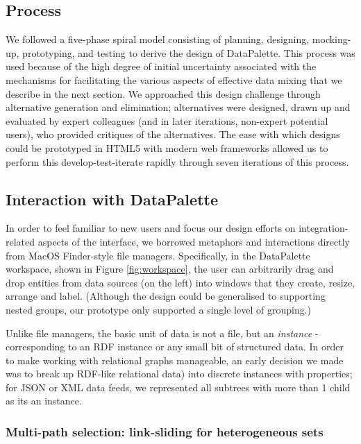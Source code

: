 \documentclass{sigchi}
\begin{document}
\subsection{Process}
We followed a five-phase spiral model consisting of planning, designing, mocking-up, prototyping, and testing to derive the design of DataPalette.  This process was used because of the high degree of initial uncertainty associated with the mechanisms for facilitating the various aspects of effective data mixing that we describe in the next section. We approached this design challenge through alternative generation and elimination; alternatives were designed, drawn up and evaluated by expert colleagues (and in later iterations, non-expert potential users), who provided critiques of the alternatives. The ease with which designs could be prototyped in HTML5 with modern web frameworks allowed us to perform this develop-test-iterate rapidly through seven iterations of this process.

\subsection{Interaction with DataPalette}
In order to feel familiar to new users and focus our design efforts on integration-related aspects of the interface, we borrowed metaphors and interactions directly from MacOS Finder-style file managers.  Specifically, in the DataPalette workspace, shown in Figure \ref{fig:workspace}, the user can arbitrarily drag and drop entities from data sources (on the left) into windows that they create, resize, arrange and label. (Although the design could be generalised to supporting nested groups, our prototype only supported a single level of grouping.)

Unlike file managers, the basic unit of data is not a file, but an \emph{instance} - corresponding to an RDF instance or any small bit of structured data. In order to make working with relational graphs manageable, an early decision we made was to break up RDF-like relational data) into discrete instances with properties; for JSON or XML data feeds, we represented all subtrees with more than 1 child as its an instance.  

\subsubsection{Multi-path selection: link-sliding for heterogeneous sets}
\end{document}
